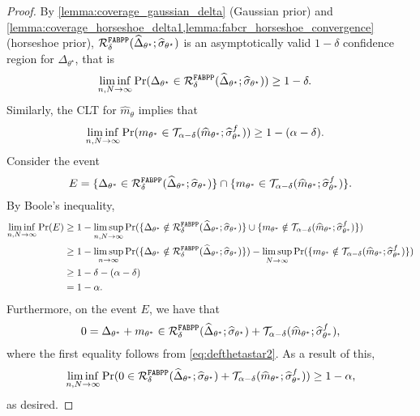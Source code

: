 \begin{proof}
    By \cref{lemma:coverage_gaussian_delta} (Gaussian prior) and \cref{lemma:coverage_horseshoe_delta1,lemma:fabcr_horseshoe_convergence} (horseshoe prior), $\mathcal R^{\mathrm{\texttt{FABPP}}}_\delta(\widehat\Delta_{\theta^\star}; \widehat{\sigma}_{\theta^\star})$  is an asymptotically valid $1-\delta$ confidence region for $\Delta_{\theta^\star}$, that is
    \begin{align*}
        \liminf_{n, N \to \infty} \text{Pr}(\Delta_{\theta^\star} \in \mathcal R^{\mathrm{\texttt{FABPP}}}_\delta(\widehat\Delta_{\theta^\star}; \widehat{\sigma}_{\theta^\star})) &\geq 1 - \delta.
    \end{align*}
    Similarly, the CLT for $\widehat m_\theta$ implies that
    \begin{align*}
        \liminf_{n, N \to \infty} \text{Pr}(m_{\theta^*} \in \mathcal T_{\alpha-\delta}(\widehat m_{\theta^*};\widehat\sigma_{\theta^*}^f)) &\geq 1 - (\alpha - \delta).
    \end{align*}
    Consider the event
    \begin{equation*}
        E = \{\Delta_{\theta^*} \in \mathcal R^{\mathrm{\texttt{FABPP}}}_\delta(\widehat\Delta_{\theta^*}; \widehat{\sigma}_{\theta^\star})\} \cap \{m_{\theta^*} \in \mathcal T_{\alpha-\delta}(\widehat m_{\theta^*};\widehat\sigma_{\theta^*}^f)\}.
    \end{equation*}
    By Boole's inequality,
    \begin{align*}
        \liminf_{n,N\to\infty} \mathrm{Pr}(E) &\geq 1 - \limsup_{n,N\to\infty}\mathrm{Pr}(\{\Delta_{\theta^*} \notin \mathcal R^{\mathrm{\texttt{FABPP}}}_\delta(\widehat\Delta_{\theta^*}; \widehat{\sigma}_{\theta^\star})\} \cup \{m_{\theta^*} \notin \mathcal T_{\alpha-\delta}(\widehat m_{\theta^*};\widehat\sigma_{\theta^*}^f)\}) \\
        &\geq 1 - \limsup_{n\to\infty}\mathrm{Pr}(\{\Delta_{\theta^*} \notin \mathcal R^{\mathrm{\texttt{FABPP}}}_\delta(\widehat\Delta_{\theta^*}; \widehat{\sigma}_{\theta^\star})\}) - \limsup_{N\to\infty} \mathrm{Pr}(\{m_{\theta^*} \notin \mathcal T_{\alpha-\delta}(\widehat m_{\theta^*};\widehat\sigma_{\theta^*}^f)\}) \\
        &\geq 1 - \delta - (\alpha - \delta) \\
        &= 1 - \alpha.
    \end{align*}
    Furthermore, on the event $E$, we have that
    \begin{equation*}
        0 = \Delta_{\theta^*} + m_{\theta^*} \in \mathcal R^{\mathrm{\texttt{FABPP}}}_\delta(\widehat\Delta_{\theta^*}; \widehat{\sigma}_{\theta^\star}) + \mathcal T_{\alpha-\delta}(\widehat m_{\theta^*};\widehat\sigma_{\theta^*}^f),
    \end{equation*}
    where the first equality follows from \cref{eq:defthetastar2}. As a result of this,
    \begin{equation*}
        \liminf_{n,N \to \infty} \text{Pr}(0 \in \mathcal R^{\mathrm{\texttt{FABPP}}}_\delta(\widehat\Delta_{\theta^*}; \widehat{\sigma}_{\theta^\star}) + \mathcal T_{\alpha-\delta}(\widehat m_{\theta^*};\widehat\sigma_{\theta^*}^f)) \geq 1 - \alpha,
    \end{equation*}
    as desired.
\end{proof}

